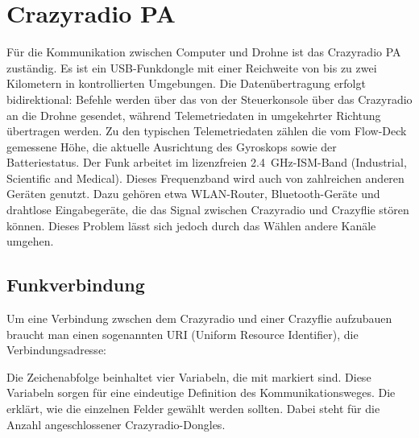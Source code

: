 \section{Crazyradio PA}
\label{sec:crpa}
Für die Kommunikation zwischen Computer und Drohne ist das Crazyradio PA zuständig.
Es ist ein USB-Funkdongle mit einer Reichweite von bis zu zwei Kilometern in kontrollierten Umgebungen.
Die Datenübertragung erfolgt bidirektional:
Befehle werden über das  von der Steuerkonsole über das Crazyradio an die Drohne gesendet, während Telemetriedaten in umgekehrter Richtung übertragen werden.
Zu den typischen Telemetriedaten zählen die vom Flow-Deck gemessene Höhe, die aktuelle Ausrichtung des Gyroskops sowie der Batteriestatus.
Der Funk arbeitet im lizenzfreien \SI{2.4}{\giga\hertz}-ISM-Band (Industrial, Scientific and Medical).
Dieses Frequenzband wird auch von zahlreichen anderen Geräten genutzt. Dazu gehören etwa WLAN-Router, Bluetooth-Geräte und drahtlose Eingabegeräte, die das Signal zwischen Crazyradio und Crazyflie stören können. Dieses Problem lässt sich jedoch durch das Wählen andere Kanäle umgehen. \cite{bc:crpa_conf}

\subsection{Funkverbindung}
Um eine Verbindung zwschen dem Crazyradio und einer Crazyflie aufzubauen braucht man einen sogenannten URI (Uniform Resource Identifier), die Verbindungsadresse:

\begin{description}
    \item {} 
    \item {} 
\end{description}

Die Zeichenabfolge beinhaltet vier Variabeln, die mit \bodyCode{<>} markiert sind. Diese Variabeln sorgen für eine eindeutige Definition des Kommunikationsweges. Die  erklärt, wie die einzelnen Felder gewählt werden sollten. Dabei steht  für die Anzahl angeschlossener Crazyradio-Dongles.

